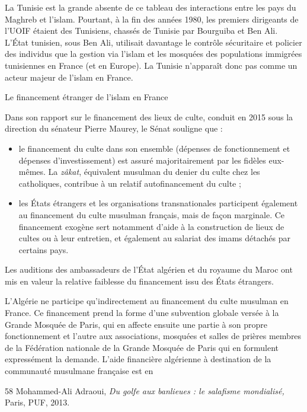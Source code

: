 La Tunisie est la grande absente de ce tableau des interactions entre
les pays du Maghreb et l'islam. Pourtant, à la fin des années 1980, les
premiers dirigeants de l'UOIF étaient des Tunisiens, chassés de Tunisie
par Bourguiba et Ben Ali. L'État tunisien, sous Ben Ali, utilisait
davantage le contrôle sécuritaire et policier des individus que la
gestion via l'islam et les mosquées des populations immigrées
tunisiennes en France (et en Europe). La Tunisie n'apparaît donc pas
comme un acteur majeur de l'islam en France.


Le financement étranger de l'islam en France


Dans son rapport sur le financement des lieux de culte, conduit en 2015
sous la direction du sénateur Pierre Maurey, le Sénat souligne que :


\begin{itemize}
\item
  le financement du culte dans son ensemble (dépenses de fonctionnement
  et dépenses d'investissement) est assuré majoritairement par les
  fidèles eux- mêmes. La \emph{zâkat}, équivalent musulman du denier du
  culte chez les catholiques, contribue à un relatif autofinancement du
  culte ;
\item
  
  les États étrangers et les organisations transnationales participent
  également au financement du culte musulman français, mais de façon
  marginale. Ce financement exogène sert notamment d'aide à la
  construction de lieux de cultes ou à leur entretien, et également au
  salariat des imams détachés par certains pays.
  
\end{itemize}


Les auditions des ambassadeurs de l'État algérien et du royaume du Maroc
ont mis en valeur la relative faiblesse du financement issu des États
étrangers.

L'Algérie ne participe qu'indirectement au financement du culte musulman
en France. Ce financement prend la forme d'une subvention globale versée
à la Grande Mosquée de Paris, qui en affecte ensuite une partie à son
propre fonctionnement et l'autre aux associations, mosquées et salles de
prières membres de la Fédération nationale de la Grande Mosquée de Paris
qui en formulent expressément la demande. L'aide financière algérienne à
destination de la communauté musulmane française est en

58 Mohammed-Ali Adraoui, \emph{Du golfe aux banlieues : le salafisme
mondialisé,} Paris, PUF, 2013.



